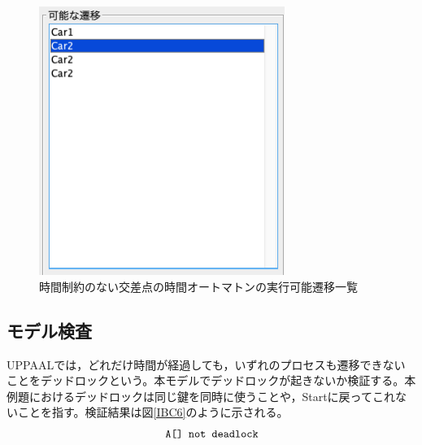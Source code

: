 \documentclass{tpu-sotu}
\begin{document}
	\begin{figure}[htbp]
	\centering
	\includegraphics[width=80mm]{IBSimuTra.png}
	\caption{時間制約のない交差点の時間オートマトンの実行可能遷移一覧}
	\label{IBST}
	\end{figure}
	\subsection{モデル検査}
	UPPAALでは，どれだけ時間が経過しても，いずれのプロセスも遷移できないことをデッドロックという。本モデルでデッドロックが起きないか検証する。本例題におけるデッドロックは同じ鍵を同時に使うことや，Startに戻ってこれないことを指す。検証結果は図\ref{IBC6}のように示される。
	\[
	\mbox{\tt{A[] not deadlock}}
	\]
	
\end{document}
